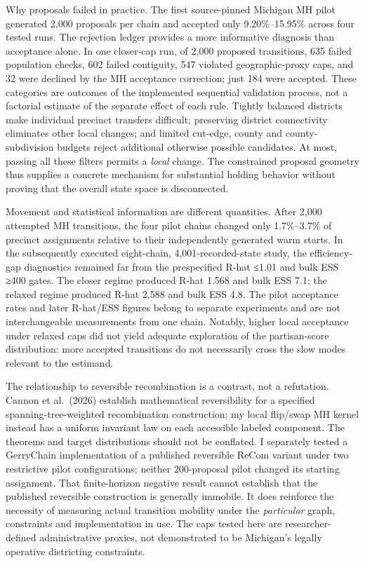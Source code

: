 \documentclass[
  10pt,
]{article}
\begin{document}
Why proposals failed in practice. The first source-pinned Michigan MH
pilot generated 2,000 proposals per chain and accepted only
9.20\%--15.95\% across four tested runs. The rejection ledger provides a
more informative diagnosis than acceptance alone. In one closer-cap run,
of 2,000 proposed transitions, 635 failed population checks, 602 failed
contiguity, 547 violated geographic-proxy caps, and 32 were declined by
the MH acceptance correction; just 184 were accepted. These categories
are outcomes of the implemented sequential validation process, not a
factorial estimate of the separate effect of each rule. Tightly balanced
districts make individual precinct transfers difficult; preserving
district connectivity eliminates other local changes; and limited
cut-edge, county and county-subdivision budgets reject additional
otherwise possible candidates. At most, passing all these filters
permits a \emph{local} change. The constrained proposal geometry thus
supplies a concrete mechanism for substantial holding behavior without
proving that the overall state space is disconnected.

Movement and statistical information are different quantities. After
2,000 attempted MH transitions, the four pilot chains changed only
1.7\%--3.7\% of precinct assignments relative to their independently
generated warm starts. In the subsequently executed eight-chain,
4,001-recorded-state study, the efficiency-gap diagnostics remained far
from the prespecified R-hat ≤1.01 and bulk ESS ≥400 gates. The closer
regime produced R-hat 1.568 and bulk ESS 7.1; the relaxed regime
produced R-hat 2.588 and bulk ESS 4.8. The pilot acceptance rates and
later R-hat/ESS figures belong to separate experiments and are not
interchangeable measurements from one chain. Notably, higher local
acceptance under relaxed caps did not yield adequate exploration of the
partisan-score distribution: more accepted transitions do not
necessarily cross the slow modes relevant to the estimand.

The relationship to reversible recombination is a contrast, not a
refutation. Cannon et al.~(2026) establish mathematical reversibility
for a specified spanning-tree-weighted recombination construction; my
local flip/swap MH kernel instead has a uniform invariant law on each
accessible labeled component. The theorems and target distributions
should not be conflated. I separately tested a GerryChain
implementation of a published reversible ReCom variant under two
restrictive pilot configurations; neither 200-proposal pilot changed its
starting assignment. That finite-horizon negative result cannot
establish that the published reversible construction is generally
immobile. It does reinforce the necessity of measuring actual transition
mobility under the \emph{particular} graph, constraints and
implementation in use. The caps tested here are researcher-defined
administrative proxies, not demonstrated to be Michigan's legally
operative districting constraints.
\end{document}
